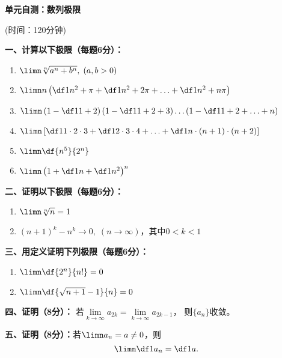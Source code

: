 \begin{center}
	{\Large\bf 单元自测：数列极限}
	
	(时间：120分钟)
\end{center}

{\bf 一、计算以下极限（每题6分）：}
\begin{enumerate}[(1)]
  \setlength{\itemindent}{1cm}
  \item $\limn\sqrt[n]{a^n+b^n},\;(a,b>0)$
  \item $\limn n\left(\df1{n^2+\pi}+\df1{n^2+2\pi}+\ldots+\df1{n^2+n\pi}\right)$
  \item $\limn\left(1-\df 1{1+2}\right)\left(1-\df
  1{1+2+3}\right)\ldots\left(1-\df 1{1+2+\ldots+n}\right)$
  \item $\limn\left[\df1{1\cdot 2\cdot 3}+\df1{2\cdot 3\cdot 4}+\ldots+
  \df1{n\cdot (n+1)\cdot (n+2)}\right]$
  \item $\limn\df{n^5}{2^n}$
  \item $\limn\left(1+\df1n+\df 1{n^2}\right)^n$
\end{enumerate}

{\bf 二、证明以下极限（每题6分）：}
\begin{enumerate}[(1)]
  \setlength{\itemindent}{1cm}
  \item $\limn\sqrt[n]n=1$
  \item $(n+1)^k-n^k\to 0,\;(n\to\infty)$，其中$0<k<1$
\end{enumerate}

{\bf 三、用定义证明下列极限（每题6分）：}
\begin{enumerate}[(1)]
  \setlength{\itemindent}{1cm}
  \item $\limn\df{2^n}{n!}=0$
  \item $\limn\df{\sqrt{n+1}-1}{n}=0$
\end{enumerate}

{\bf 四、证明（8分）：}
若$\lim\limits_{k\to\infty}a_{2k}=\lim\limits_{k\to\infty}a_{2k-1}$，
则$\{a_n\}$收敛。

{\bf 五、证明（8分）：}若$\limn a_n=a\ne0$，则
$$\limn\df1{a_n}=\df1a.$$

% 

